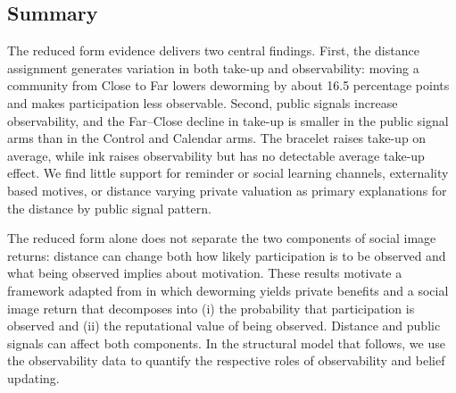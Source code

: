 \documentclass[ECM\space ReStud.tex]{subfiles}
\begin{document}

\subsection{Summary}

The reduced form evidence delivers two central findings. First, the distance assignment generates variation in both take-up and observability: moving a community from Close to Far lowers deworming by about 16.5 percentage points and makes participation less observable. Second, public signals increase observability, and the Far--Close decline in take-up is smaller in the public signal arms than in the Control and Calendar arms. The bracelet raises take-up on average, while ink raises observability but has no detectable average take-up effect. We find little support for reminder or social learning channels, externality based motives, or distance varying private valuation as primary explanations for the distance by public signal pattern.

The reduced form alone does not separate the two components of social image returns: distance can change both how likely participation is to be observed and what being observed implies about motivation. These results motivate a framework adapted from \citet{Benabou_laws_2011} in which deworming yields private benefits and a social image return that decomposes into (i) the probability that participation is observed and (ii) the reputational value of being observed. Distance and public signals can affect both components. In the structural model that follows, we use the observability data to quantify the respective roles of observability and belief updating.
\end{document}
